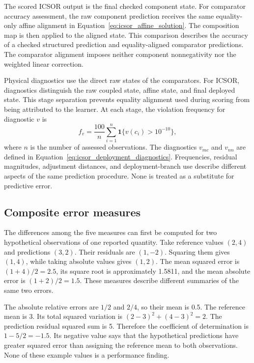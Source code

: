 The scored ICSOR output is the final checked component state. For comparator accuracy assessment, the raw component prediction receives the same equality-only affine alignment in Equation~\eqref{eq:icsor_affine_solution}. The composition map is then applied to the aligned state. This comparison describes the accuracy of a checked structured prediction and equality-aligned comparator predictions. The comparator alignment imposes neither component nonnegativity nor the weighted linear correction.

Physical diagnostics use the direct raw states of the comparators. For ICSOR, diagnostics distinguish the raw coupled state, affine state, and final deployed state. This stage separation prevents equality alignment used during scoring from being attributed to the learner. At each stage, the violation frequency for diagnostic \(v\) is
\begin{equation}
\label{eq:icsor_violation_frequency}
f_v=\frac{100}{n}\sum_{i=1}^{n}
\mathbf{1}\{v(c_i)>10^{-10}\},
\end{equation}
where \(n\) is the number of assessed observations. The diagnostics \(v_{mc}\) and \(v_{nn}\) are defined in Equation~\eqref{eq:icsor_deployment_diagnostics}. Frequencies, residual magnitudes, adjustment distances, and deployment-branch use describe different aspects of the same prediction procedure. None is treated as a substitute for predictive error.

\subsection{Composite error measures}

The differences among the five measures can first be computed for two hypothetical observations of one reported quantity. Take reference values \((2,4)\) and predictions \((3,2)\). Their residuals are \((1,-2)\). Squaring them gives \((1,4)\), while taking absolute values gives \((1,2)\). The mean squared error is \((1+4)/2=2.5\), its square root is approximately 1.5811, and the mean absolute error is \((1+2)/2=1.5\). These measures describe different summaries of the same two errors.

The absolute relative errors are \(1/2\) and \(2/4\), so their mean is 0.5. The reference mean is 3. Its total squared variation is \((2-3)^2+(4-3)^2=2\). The prediction residual squared sum is 5. Therefore the coefficient of determination is \(1-5/2=-1.5\). Its negative value says that the hypothetical predictions have greater squared error than assigning the reference mean to both observations. None of these example values is a performance finding.

